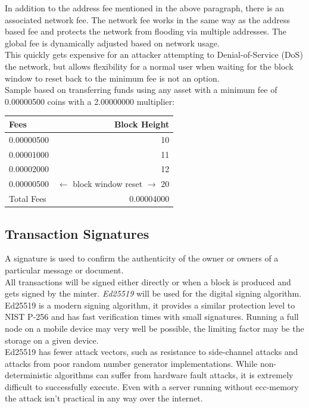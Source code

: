 \documentclass[12pt,a4paper]{article}
\begin{document}
  In addition to the address fee mentioned in the above paragraph, there is an
  associated  network fee. The network fee works in the same way as
  the address based fee and protects the network from flooding via multiple
  addresses. The global fee is dynamically adjusted based on network usage.\\

  This quickly gets expensive for an attacker attempting to Denial-of-Service
  (DoS) the network, but allows flexibility for a normal user when waiting for
  the block window to reset back to the minimum fee is not an option.\\

  Sample based on transferring funds using any asset with a minimum fee of
  0.00000500 coins with a 2.00000000 multiplier:

  \vspace{3mm}
  \begin{tabular}{@{}lr@{}}
    Fees & Block Height     \\ \toprule
    0.00000500 & 10         \\
    0.00001000 & 11         \\
    0.00002000 & 12         \\
    0.00000500 & $\leftarrow{}$ block window reset $\rightarrow{}$ 20 \\ \midrule{}
    Total Fees & 0.00004000 \\
    \bottomrule
  \end{tabular}

  \subsection{Transaction Signatures}
  A signature is used to confirm the authenticity of the owner or owners
  of a particular message or document.\\

  All transactions will be signed either directly or when a block is produced
  and gets signed by the minter. \textit{Ed25519}\cite{ed25519} will be used for
  the digital signing algorithm. Ed25519 is a modern signing algorithm, it
  provides a similar protection level to NIST P-256 and has fast verification
  times with small signatures. Running a full node on a mobile device may very
  well be possible, the limiting factor may be the storage on a given device.\\

  Ed25519 has fewer attack vectors, such as resistance to side-channel attacks
  and attacks from poor random number generator implementations. While
  non-deterministic algorithms can suffer from hardware fault attacks, it is
  extremely difficult to successfully execute. Even with a server running
  without \gls{ecc-memory} the attack isn't practical in any way over the
  internet.
\end{document}
